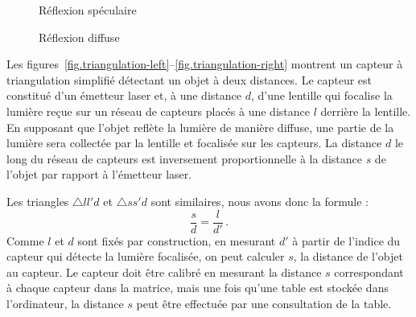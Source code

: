 \begin{figure}
\begin{minipage}{.45\textwidth}
\caption{Réflexion spéculaire\label{fig.reflect-left}}
\end{minipage}
\hspace{\fill}
\begin{minipage}{.45\textwidth}
\caption{Réflexion diffuse\label{fig.reflect-right}}
\end{minipage}
\end{figure}

Les figures~\ref{fig.triangulation-left}--\ref{fig.triangulation-right} montrent un capteur à triangulation simplifié détectant un objet à deux distances. Le capteur est constitué d'un émetteur laser et, à une distance $d$, d'une lentille qui focalise la lumière reçue sur un réseau de capteurs placés à une distance $l$ derrière la lentille. En supposant que l'objet reflète la lumière de manière diffuse, une partie de la lumière sera collectée par la lentille et focalisée sur les capteurs. La distance $d$ le long du réseau de capteurs est inversement proportionnelle à la distance $s$ de l'objet par rapport à l'émetteur laser.

Les triangles $\triangle ll'd$ et $\triangle ss'd$ sont similaires, nous avons donc la formule :
\[
\frac{s}{d} = \frac{l}{d'}\,.
\]
Comme $l$ et $d$ sont fixés par construction, en mesurant $d'$ à partir de l'indice du capteur qui détecte la lumière focalisée, on peut calculer $s$, la distance de l'objet au capteur. Le capteur doit être calibré en mesurant la distance $s$ correspondant à chaque capteur dans la matrice, mais une fois qu'une table est stockée dans l'ordinateur, la distance $s$ peut être effectuée par une consultation de la table.

